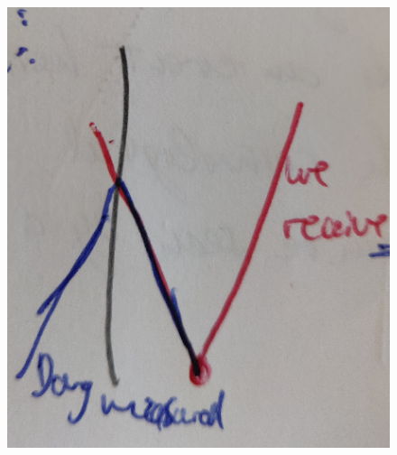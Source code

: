 \begin{figure}[h!]
	\centering
	\includegraphics[width=0.7\linewidth]{gfx/luminositydistance}
	\caption{}
	\label{fig:luminositydistance}
\end{figure}
\newpage
